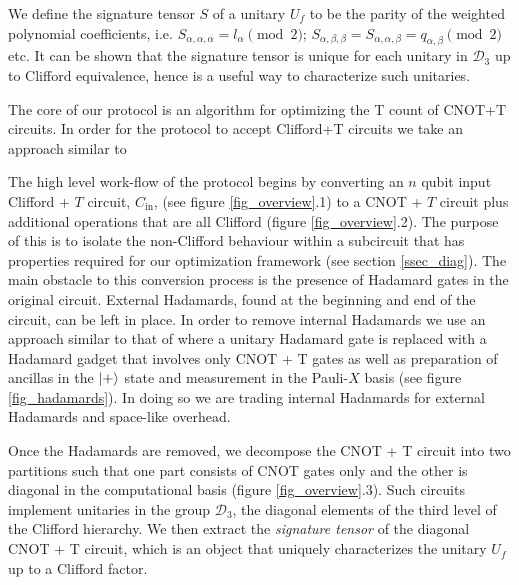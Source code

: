 \documentclass[notitlepage]{article}
\theoremstyle{definition}
\theoremstyle{problem}
\theoremstyle{lemma}
\begin{document}
		We define the signature tensor $S$ of a unitary $U_f$ to be the parity of the weighted polynomial coefficients, i.e. $S_{\alpha,\alpha,\alpha} = l_{\alpha} \pmod{2}$; $S_{\alpha,\beta,\beta} = S_{\alpha,\alpha,\beta} = q_{\alpha,\beta} \pmod{2}$ etc.
		It can be shown that the signature tensor is unique for each unitary in $\mathcal{D}_3$ up to Clifford equivalence, hence is a useful way to characterize such unitaries. %
		
			
		The core of our protocol is an algorithm for optimizing the T count of CNOT+T circuits. In order for the protocol to accept Clifford+T circuits we take an approach similar to 
		\fi
		
\label{ssec_workflow}

The high level work-flow of the protocol begins by converting an $n$ qubit input Clifford + $T$ circuit, $C_{\text{in}}$, (see figure \ref{fig_overview}.1) to a CNOT + $T$ circuit plus additional operations that are all Clifford (figure \ref{fig_overview}.2). The purpose of this is to isolate the non-Clifford behaviour within a subcircuit that has properties required for our optimization framework (see section \ref{ssec_diag}). The main obstacle to this conversion process is the presence of Hadamard gates in the original circuit. External Hadamards, found at the beginning and end of the circuit, can be left in place. In order to remove internal Hadamards we use an approach similar to that of \cite{1_Montanaro_2017, 2_Bremner_2010} where a unitary Hadamard gate is replaced with a Hadamard gadget that involves only CNOT + T gates as well as preparation of ancillas in the $\left\vert{+}\right\rangle$ state and measurement in the Pauli-$X$ basis (see figure \ref{fig_hadamards}). In doing so we are trading internal Hadamards for external Hadamards and space-like overhead.

Once the Hadamards are removed, we decompose the CNOT + T circuit into two partitions such that one part consists of CNOT gates only and the other is diagonal in the computational basis (figure \ref{fig_overview}.3). Such circuits implement unitaries in the group $\mathcal{D}_3$, the diagonal elements of the third level of the Clifford hierarchy. 
We then extract the \emph{signature tensor} of the diagonal CNOT + T circuit, which is an object that uniquely characterizes the unitary $U_f$ up to a Clifford factor. 
\end{document}
